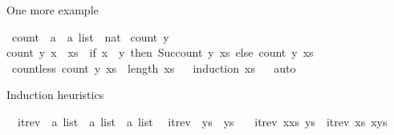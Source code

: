 \begin{isabellebody}
%
\begin{isamarkuptext}%
One more example%
\end{isamarkuptext}\isamarkuptrue%
\isamarkupfalse%
\ count\ {\isacharcolon}{\kern0pt}{\isacharcolon}{\kern0pt}\ {\isachardoublequoteopen}{\isacharprime}{\kern0pt}a\ {\isasymRightarrow}\ {\isacharprime}{\kern0pt}a\ list\ {\isasymRightarrow}\ nat{\isachardoublequoteclose}\ \isanewline
{\isachardoublequoteopen}count\ y\ {\isacharbrackleft}{\kern0pt}{\isacharbrackright}{\kern0pt}\ {\isacharequal}{\kern0pt}\ {}{\isachardoublequoteclose}\ {\isacharbar}{\kern0pt}\isanewline
{\isachardoublequoteopen}count\ y\ {\isacharparenleft}{\kern0pt}x\ {\isacharhash}{\kern0pt}\ xs{\isacharparenright}{\kern0pt}\ {\isacharequal}{\kern0pt}\ {\isacharparenleft}{\kern0pt}if\ x\ {\isacharequal}{\kern0pt}\ y\ then\ Suc{\isacharparenleft}{\kern0pt}count\ y\ xs{\isacharparenright}{\kern0pt}\ else\ count\ y\ xs{\isacharparenright}{\kern0pt}{\isachardoublequoteclose}\isanewline
\isanewline
{}\isamarkupfalse%
\ count{\isacharunderscore}{\kern0pt}less{\isacharcolon}{\kern0pt}\ {\isachardoublequoteopen}count\ y\ xs\ {\isasymle}\ length\ xs{\isachardoublequoteclose}\isanewline
%
\isadelimproof
\ \ %
\endisadelimproof
%
\isatagproof
{}\isamarkupfalse%
{\isacharparenleft}{\kern0pt}induction\ xs{\isacharparenright}{\kern0pt}\isanewline
\ \ \isamarkupfalse%
{\isacharparenleft}{\kern0pt}auto{\isacharparenright}{\kern0pt}\isanewline
\ \ \isamarkupfalse%
%
\endisatagproof
{\isafoldproof}%
%
\isadelimproof
%
\endisadelimproof
%
\begin{isamarkuptext}%
Induction heuristics%
\end{isamarkuptext}\isamarkuptrue%
\isamarkupfalse%
\isanewline
\ \ itrev\ {\isacharcolon}{\kern0pt}{\isacharcolon}{\kern0pt}\ {\isachardoublequoteopen}{\isacharprime}{\kern0pt}a\ list\ {\isasymRightarrow}\ {\isacharprime}{\kern0pt}a\ list\ {\isasymRightarrow}\ {\isacharprime}{\kern0pt}a\ list{\isachardoublequoteclose}\isanewline
{}\isanewline
\ \ {\isachardoublequoteopen}itrev\ {\isacharbrackleft}{\kern0pt}{\isacharbrackright}{\kern0pt}\ ys\ {\isacharequal}{\kern0pt}\ ys{\isachardoublequoteclose}\ {\isacharbar}{\kern0pt}\isanewline
\ \ {\isachardoublequoteopen}itrev\ {\isacharparenleft}{\kern0pt}x{\isacharhash}{\kern0pt}xs{\isacharparenright}{\kern0pt}\ ys\ {\isacharequal}{\kern0pt}\ itrev\ xs\ {\isacharparenleft}{\kern0pt}x{\isacharhash}{\kern0pt}ys{\isacharparenright}{\kern0pt}{\isachardoublequoteclose}\isanewline

\end{isabellebody}
